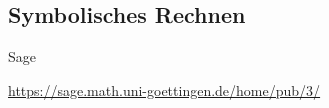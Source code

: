 \documentclass[hyperref={xetex}]{beamer}
\begin{document}
\subsection{Symbolisches Rechnen}

\begin{frame}[fragile]{Sage}
\begin{center}
\url{https://sage.math.uni-goettingen.de/home/pub/3/}
\end{center}
\end{frame}

%
%
\end{document}
